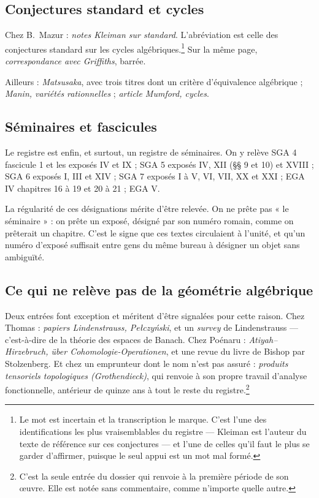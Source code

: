 \documentclass[11pt,a4paper]{article}
\begin{document}
\subsection*{Conjectures standard et cycles}

Chez B.~Mazur : \emph{notes Kleiman sur standard}. L'abréviation est celle des
conjectures standard sur les cycles algébriques.\footnote{Le mot est incertain
et la transcription le marque. C'est l'une des identifications les plus
vraisemblables du registre --- Kleiman est l'auteur du texte de référence sur
ces conjectures --- et l'une de celles qu'il faut le plus se garder d'affirmer,
puisque le seul appui est un mot mal formé.} Sur la même page,
\emph{correspondance avec Griffiths}, barrée.

Ailleurs : \emph{Matsusaka}, avec trois titres dont un critère d'équivalence
algébrique ; \emph{Manin, variétés rationnelles} ; \emph{article Mumford,
cycles}.

\subsection*{Séminaires et fascicules}

Le registre est enfin, et surtout, un registre de séminaires. On y relève SGA 4
fascicule 1 et les exposés IV et IX ; SGA 5 exposés IV, XII (§§ 9 et 10) et
XVIII ; SGA 6 exposés I, III et XIV ; SGA 7 exposés I à V, VI, VII, XX et XXI ;
EGA IV chapitres 16 à 19 et 20 à 21 ; EGA V.

La régularité de ces désignations mérite d'être relevée. On ne prête pas « le
séminaire » : on prête un exposé, désigné par son numéro romain, comme on
prêterait un chapitre. C'est le signe que ces textes circulaient à l'unité, et
qu'un numéro d'exposé suffisait entre gens du même bureau à désigner un objet
sans ambiguïté.

\subsection*{Ce qui ne relève pas de la géométrie algébrique}

Deux entrées font exception et méritent d'être signalées pour cette raison.
Chez Thomas : \emph{papiers Lindenstrauss, Pełczyński}, et un \emph{survey} de
Lindenstrauss --- c'est-à-dire de la théorie des espaces de Banach. Chez
Poénaru : \emph{Atiyah--Hirzebruch, über Cohomologie-Operationen}, et une revue
du livre de Bishop par Stolzenberg. Et chez un emprunteur dont le nom n'est pas
assuré : \emph{produits tensoriels topologiques (Grothendieck)}, qui renvoie à
son propre travail d'analyse fonctionnelle, antérieur de quinze ans à tout le
reste du registre.\footnote{C'est la seule entrée du dossier qui renvoie à la
première période de son œuvre. Elle est notée sans commentaire, comme
n'importe quelle autre.}
\end{document}
